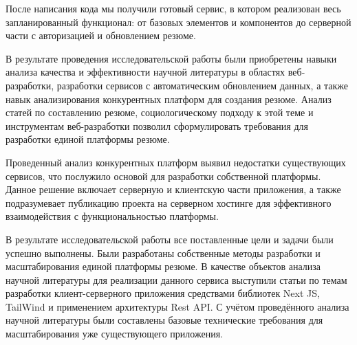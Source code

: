 \documentclass[master, och, diploma]{SCWorks}
\begin{document}
После написания кода мы получили готовый сервис, в котором реализован весь запланированный функционал: от базовых элементов и компонентов до серверной части с авторизацией и обновлением резюме.






\newpage
\conclusion
В результате проведения исследовательской работы были приобретены навыки анализа качества и эффективности научной литературы в областях веб-разработки, разработки сервисов с автоматическим обновлением данных, а также навык анализирования конкурентных платформ для создания резюме. Анализ статей по составлению резюме, социологическому подходу к этой теме и инструментам веб-разработки позволил сформулировать требования для разработки единой платформы резюме.

Проведенный анализ конкурентных платформ выявил недостатки существующих сервисов, что послужило основой для разработки собственной платформы. Данное решение включает серверную и клиентскую части приложения, а также подразумевает публикацию проекта на серверном хостинге для эффективного взаимодействия с функциональностью платформы.

В результате исследовательской работы все поставленные цели и задачи были успешно выполнены. Были разработаны собственные методы разработки и масштабирования единой платформы резюме. В качестве объектов анализа научной литературы для реализации данного сервиса выступили статьи по темам разработки клиент-серверного приложения средствами библиотек Next JS, TailWind и применением архитектуры Rest API. С учётом проведённого анализа научной литературы были составлены базовые технические требования для масштабирования уже существующего приложения. 






%




\end{document}
